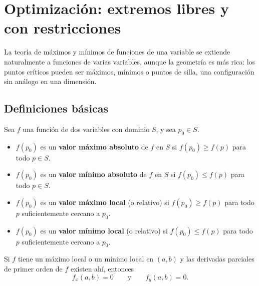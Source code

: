 
\chapter{Optimización: extremos libres y con restricciones}



La teoría de máximos y mínimos de funciones de una variable se extiende
naturalmente a funciones de varias variables, aunque la geometría es más
rica: los puntos críticos pueden ser máximos, mínimos o puntos de silla,
una configuración sin análogo en una dimensión.

\section{Definiciones básicas}

\begin{definition}
Sea $f$ una función de dos variables con dominio $S$, y sea
$p_0\in S$.
\begin{itemize}
    \item $f(p_0)$ es un \textbf{valor máximo absoluto} de $f$ en $S$ si
    $f(p_0) \geq f(p)$ para todo $p\in S$.
    \item $f(p_0)$ es un \textbf{valor mínimo absoluto} de $f$ en $S$ si
    $f(p_0) \leq f(p)$ para todo $p\in S$.
    \item $f(p_0)$ es un \textbf{valor máximo local} (o relativo) si
    $f(p_0) \geq f(p)$ para todo $p$ suficientemente cercano a $p_0$.
    \item $f(p_0)$ es un \textbf{valor mínimo local} (o relativo) si
    $f(p_0) \leq f(p)$ para todo $p$ suficientemente cercano a $p_0$.
\end{itemize}
\end{definition}

\begin{theorem}
Si $f$ tiene un máximo local o un mínimo local en $(a,b)$ y las
derivadas parciales de primer orden de $f$ existen ahí, entonces
\[
f_x(a,b) = 0 \qquad\text{y}\qquad f_y(a,b) = 0.
\]
\end{theorem}

